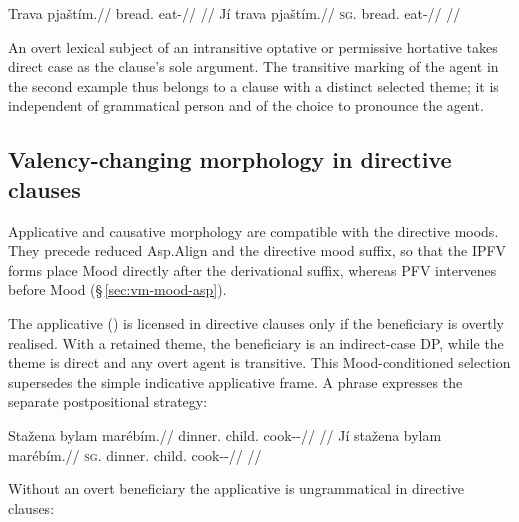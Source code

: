 \pex\label{ex:val-directive-simple}
\a
\begingl
\gla Trava pjaštím.//
\glb bread.\Dir{} eat-\Imp{}//
\glft {} //
\endgl
\a
\begingl
\gla Jí trava pjaštím.//
\textsc{sg}.\Trs{} bread.\Dir{} eat-\Imp{}//
\glft {} //
\endgl
\xe

\noindent An overt lexical subject of an intransitive optative or permissive
hortative takes direct case as the clause's sole argument. The transitive
marking of the agent in the second example thus belongs to a clause with a
distinct selected theme; it is independent of grammatical person and of the
choice to pronounce the agent.

\subsection{Valency-changing morphology in directive clauses}\label{sec:mood-directive-valency}

Applicative and causative morphology are compatible with the directive moods.
They precede reduced Asp.Align and the directive mood suffix, so that the
IPFV forms place Mood directly after the derivational suffix, whereas PFV
 intervenes before Mood (§\,\ref{sec:vm-mood-asp}).

The applicative () is licensed in directive clauses only if the
beneficiary is overtly realised. With a retained theme, the beneficiary is an
indirect-case DP, while the theme is direct and any overt agent is transitive.
This Mood-conditioned selection supersedes the simple indicative applicative
frame. A  phrase expresses the separate postpositional strategy:

\pex\label{ex:val-directive-appl}
\a
\begingl
\gla Stažena bylam marébím.//
\glb dinner.\Dir{} child.\Ind{} cook-\Appl{}-\Imp{}//
\glft {} //
\endgl
\a
\begingl
\gla Jí stažena bylam marébím.//
\textsc{sg}.\Trs{} dinner.\Dir{} child.\Ind{} cook-\Appl{}-\Imp{}//
\glft {} //
\endgl
\xe

\noindent Without an overt beneficiary the applicative is ungrammatical in
directive clauses:

\pex
{}  
\xe

